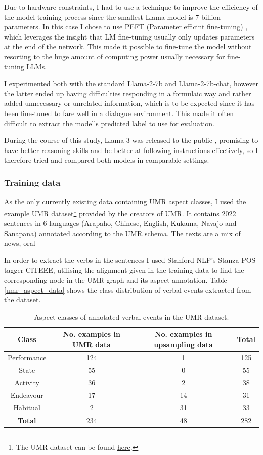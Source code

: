Due to hardware constraints, I had to use a technique to improve the efficiency of the model training process since the smallest Llama model is 7 billion parameters. In this case I chose to use PEFT (Parameter efficint fine-tuning) \citep{peft}, which leverages the insight that LM fine-tuning usually only updates parameters at the end of the network. This made it possible to fine-tune the model without resorting to the huge amount of computing power usually necessary for fine-tuning LLMs.

I experimented both with the standard \textsf{Llama-2-7b} and \textsf{Llama-2-7b-chat}, however the latter ended up having difficulties responding in a formulaic way and rather added unnecessary or unrelated information, which is to be expected since it has been fine-tuned to fare well in a dialogue environment. This made it often difficult to extract the model's predicted label to use for evaluation. 

During the course of this study, Llama 3 was released to the public \citep{meta2024llama3}, promising to have better reasoning skills and be better at following instructions effectively, so I therefore tried and compared both models in comparable settings.

\subsubsection*{Training data}
As the only currently existing data containing UMR aspect classes, I used the example UMR dataset\footnote{The UMR dataset can be found \hyperlink{https://umr4nlp.github.io/web/data.html}{here}.} provided by the creators of UMR. It contains 2022 sentences in 6 languages (Arapaho, Chinese, English, Kukama, Navajo and Sanapana) annotated according to the UMR schema. The texts are a mix of news, oral 

In order to extract the verbs in the sentences I used Stanford NLP's Stanza POS tagger CITEEE, utilising the alignment given in the training data to find the corresponding node in the UMR graph and its aspect annotation. Table \ref*{umr_aspect_data} shows the class distribution of verbal events extracted from the dataset.
\begin{table}
    \centering
    \begin{tabular}{|c|c|c|c|}
        Class & No. examples in UMR data & No. examples in upsampling data & \textbf{Total} \\ \hline
        Performance & 124 & 1 & 125\\
        State & 55 & 0 & 55\\
        Activity & 36 & 2 & 38\\
        Endeavour & 17 & 14 & 31\\
        Habitual & 2 & 31 & 33\\ \hline
        \textbf{Total} & 234 & 48 & 282
    \end{tabular}
    \caption{Aspect classes of annotated verbal events in the UMR dataset.}
\end{table}
\label{umr_aspect_data}

